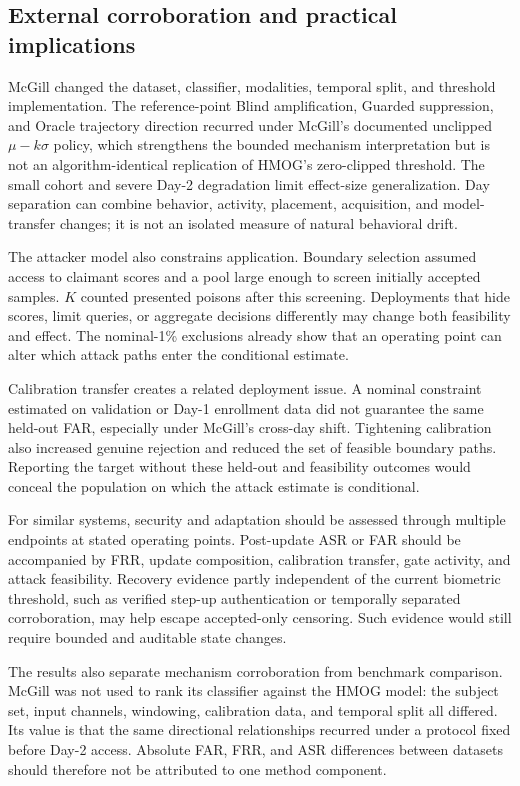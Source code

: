 \documentclass[technologies,article,submit,moreauthors]{Definitions/mdpi}
\begin{document}
\subsection{External corroboration and practical implications}\label{sec:external-corroboration-and-practical-implications}

McGill changed the dataset, classifier, modalities, temporal split, and threshold implementation. The reference-point Blind amplification, Guarded suppression, and Oracle trajectory direction recurred under McGill's documented unclipped \(\mu-k\sigma\) policy, which strengthens the bounded mechanism interpretation but is not an algorithm-identical replication of HMOG's zero-clipped threshold. The small cohort and severe Day-2 degradation limit effect-size generalization. Day separation can combine behavior, activity, placement, acquisition, and model-transfer changes; it is not an isolated measure of natural behavioral drift.

The attacker model also constrains application. Boundary selection assumed access to claimant scores and a pool large enough to screen initially accepted samples. \(K\) counted presented poisons after this screening. Deployments that hide scores, limit queries, or aggregate decisions differently may change both feasibility and effect. The nominal-1\% exclusions already show that an operating point can alter which attack paths enter the conditional estimate.

Calibration transfer creates a related deployment issue. A nominal constraint estimated on validation or Day-1 enrollment data did not guarantee the same held-out FAR, especially under McGill's cross-day shift. Tightening calibration also increased genuine rejection and reduced the set of feasible boundary paths. Reporting the target without these held-out and feasibility outcomes would conceal the population on which the attack estimate is conditional.

For similar systems, security and adaptation should be assessed through multiple endpoints at stated operating points. Post-update ASR or FAR should be accompanied by FRR, update composition, calibration transfer, gate activity, and attack feasibility. Recovery evidence partly independent of the current biometric threshold, such as verified step-up authentication or temporally separated corroboration, may help escape accepted-only censoring. Such evidence would still require bounded and auditable state changes.

The results also separate mechanism corroboration from benchmark comparison. McGill was not used to rank its classifier against the HMOG model: the subject set, input channels, windowing, calibration data, and temporal split all differed. Its value is that the same directional relationships recurred under a protocol fixed before Day-2 access. Absolute FAR, FRR, and ASR differences between datasets should therefore not be attributed to one method component.
\end{document}

